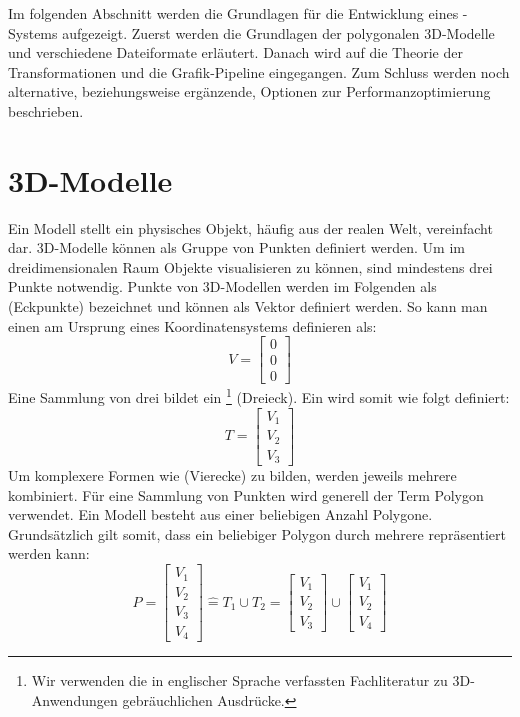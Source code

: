 
Im folgenden Abschnitt werden die Grundlagen für die Entwicklung eines -Systems aufgezeigt.
Zuerst werden die Grundlagen der polygonalen 3D-Modelle und verschiedene Dateiformate erläutert. Danach wird auf die Theorie der Transformationen und die Grafik-Pipeline eingegangen. Zum Schluss werden noch alternative, beziehungsweise ergänzende, Optionen zur Performanzoptimierung beschrieben.

\section{3D-Modelle}
Ein Modell stellt ein physisches Objekt, häufig aus der realen Welt, vereinfacht dar.
3D-Modelle können als Gruppe von Punkten definiert werden.
Um im dreidimensionalen Raum Objekte visualisieren zu können, sind mindestens drei Punkte notwendig.
Punkte von 3D-Modellen werden im Folgenden als  (Eckpunkte) bezeichnet und können als Vektor definiert werden.
So kann man einen  am Ursprung eines Koordinatensystems definieren als:
$$ V =
\begin{bmatrix}
  0 \\
  0 \\
  0
\end{bmatrix}
$$
\bigbreak
Eine Sammlung von drei  bildet ein \footnote{Wir verwenden die in englischer Sprache verfassten Fachliteratur zu 3D-Anwendungen gebräuchlichen Ausdrücke.} (Dreieck). Ein  wird somit wie folgt definiert:
$$ T =
\begin{bmatrix}
  V_1 \\
  V_2 \\
  V_3
\end{bmatrix}
$$
\bigbreak
Um komplexere Formen wie  (Vierecke) zu bilden, werden jeweils mehrere  kombiniert. Für eine Sammlung von Punkten wird generell der Term Polygon verwendet.
Ein Modell besteht aus einer beliebigen Anzahl Polygone.
Grundsätzlich gilt somit, dass ein beliebiger Polygon durch mehrere  repräsentiert werden kann:
\bigbreak
$$ P =
\begin{bmatrix}
  V_1 \\
  V_2 \\
  V_3 \\
  V_4
\end{bmatrix}
\widehat{=} T_1 \cup T_2
= \begin{bmatrix}
  V_1 \\
  V_2 \\
  V_3
\end{bmatrix}
\cup
\begin{bmatrix}
  V_1 \\
  V_2 \\
  V_4
\end{bmatrix}
$$

